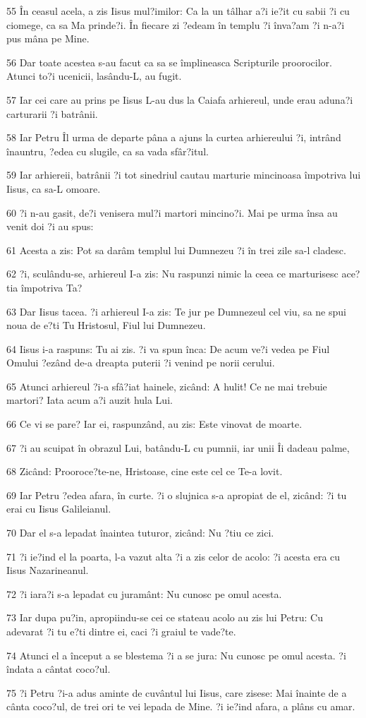 \par 55 În ceasul acela, a zis Iisus mul?imilor: Ca la un tâlhar a?i ie?it cu sabii ?i cu ciomege, ca sa Ma prinde?i. În fiecare zi ?edeam în templu ?i înva?am ?i n-a?i pus mâna pe Mine.
\par 56 Dar toate acestea s-au facut ca sa se împlineasca Scripturile proorocilor. Atunci to?i ucenicii, lasându-L, au fugit.
\par 57 Iar cei care au prins pe Iisus L-au dus la Caiafa arhiereul, unde erau aduna?i carturarii ?i batrânii.
\par 58 Iar Petru Îl urma de departe pâna a ajuns la curtea arhiereului ?i, intrând înauntru, ?edea cu slugile, ca sa vada sfâr?itul.
\par 59 Iar arhiereii, batrânii ?i tot sinedriul cautau marturie mincinoasa împotriva lui Iisus, ca sa-L omoare.
\par 60 ?i n-au gasit, de?i venisera mul?i martori mincino?i. Mai pe urma însa au venit doi ?i au spus:
\par 61 Acesta a zis: Pot sa darâm templul lui Dumnezeu ?i în trei zile sa-l cladesc.
\par 62 ?i, sculându-se, arhiereul I-a zis: Nu raspunzi nimic la ceea ce marturisesc ace?tia împotriva Ta?
\par 63 Dar Iisus tacea. ?i arhiereul I-a zis: Te jur pe Dumnezeul cel viu, sa ne spui noua de e?ti Tu Hristosul, Fiul lui Dumnezeu.
\par 64 Iisus i-a raspuns: Tu ai zis. ?i va spun înca: De acum ve?i vedea pe Fiul Omului ?ezând de-a dreapta puterii ?i venind pe norii cerului.
\par 65 Atunci arhiereul ?i-a sfâ?iat hainele, zicând: A hulit! Ce ne mai trebuie martori? Iata acum a?i auzit hula Lui.
\par 66 Ce vi se pare? Iar ei, raspunzând, au zis: Este vinovat de moarte.
\par 67 ?i au scuipat în obrazul Lui, batându-L cu pumnii, iar unii Îi dadeau palme,
\par 68 Zicând: Prooroce?te-ne, Hristoase, cine este cel ce Te-a lovit.
\par 69 Iar Petru ?edea afara, în curte. ?i o slujnica s-a apropiat de el, zicând: ?i tu erai cu Iisus Galileianul.
\par 70 Dar el s-a lepadat înaintea tuturor, zicând: Nu ?tiu ce zici.
\par 71 ?i ie?ind el la poarta, l-a vazut alta ?i a zis celor de acolo: ?i acesta era cu Iisus Nazarineanul.
\par 72 ?i iara?i s-a lepadat cu juramânt: Nu cunosc pe omul acesta.
\par 73 Iar dupa pu?in, apropiindu-se cei ce stateau acolo au zis lui Petru: Cu adevarat ?i tu e?ti dintre ei, caci ?i graiul te vade?te.
\par 74 Atunci el a început a se blestema ?i a se jura: Nu cunosc pe omul acesta. ?i îndata a cântat coco?ul.
\par 75 ?i Petru ?i-a adus aminte de cuvântul lui Iisus, care zisese: Mai înainte de a cânta coco?ul, de trei ori te vei lepada de Mine. ?i ie?ind afara, a plâns cu amar.

